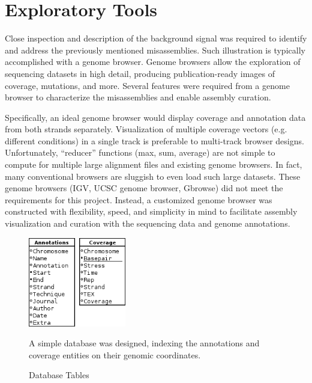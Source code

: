 
\section{Exploratory Tools}

 Close inspection and description of the background signal was required to identify and address the previously mentioned misassemblies. Such illustration is typically accomplished with a genome browser. Genome browsers allow the exploration of sequencing datasets in high detail, producing publication-ready images of coverage, mutations, and more. Several features were required from a genome browser to characterize the misassemblies and enable assembly curation. 

Specifically, an ideal genome browser would display coverage and annotation data from both strands separately. Visualization of multiple coverage vectors (e.g. different conditions) in a single track is preferable to multi-track browser designs. Unfortunately, ``reducer'' functions (max, sum, average) are not simple to compute for multiple large alignment files and existing genome browsers. In fact, many conventional browsers are sluggish to even load such large datasets. These genome browsers (IGV, UCSC genome browser, Gbrowse) did not meet the requirements for this project. Instead, a customized genome browser was constructed with flexibility, speed, and simplicity in mind to facilitate assembly visualization and curation with the sequencing data and genome annotations.

\begin{figure}
\small
\vspace{-20pt}
\begin{center}
\includegraphics[width=0.38\textwidth]{images/Assembly/Browser/Genome_browser_schema.png}
\end{center}
\vspace{-20pt}
\caption{Database Tables}\label{fig:5.5}
A simple database was designed, indexing the annotations and coverage entities on their genomic coordinates.
\end{figure}

